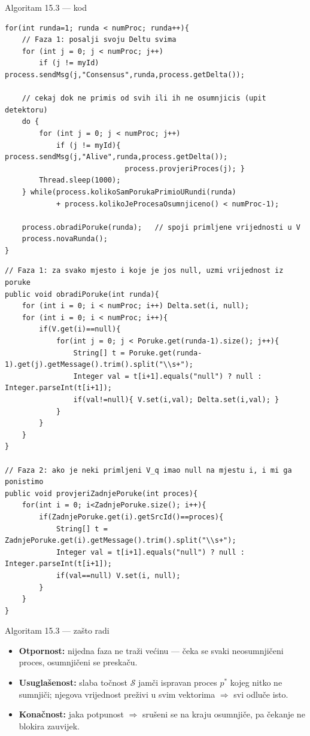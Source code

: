 \documentclass[aspectratio=169,11pt]{beamer}
\newcommand{\Ds}{\ensuremath{\mathcal{S}}}
\begin{document}
\begin{frame}{Algoritam 15.3 --- kod}
\begin{lstlisting}
for(int runda=1; runda < numProc; runda++){
    // Faza 1: posalji svoju Deltu svima
    for (int j = 0; j < numProc; j++)
        if (j != myId) process.sendMsg(j,"Consensus",runda,process.getDelta());

    // cekaj dok ne primis od svih ili ih ne osumnjicis (upit detektoru)
    do {
        for (int j = 0; j < numProc; j++)
            if (j != myId){ process.sendMsg(j,"Alive",runda,process.getDelta());
                            process.provjeriProces(j); }
        Thread.sleep(1000);
    } while(process.kolikoSamPorukaPrimioURundi(runda)
            + process.kolikoJeProcesaOsumnjiceno() < numProc-1);

    process.obradiPoruke(runda);   // spoji primljene vrijednosti u V
    process.novaRunda();
}
\end{lstlisting}

\begin{lstlisting}
// Faza 1: za svako mjesto i koje je jos null, uzmi vrijednost iz poruke
public void obradiPoruke(int runda){
    for (int i = 0; i < numProc; i++) Delta.set(i, null);
    for (int i = 0; i < numProc; i++){
        if(V.get(i)==null){
            for(int j = 0; j < Poruke.get(runda-1).size(); j++){
                String[] t = Poruke.get(runda-1).get(j).getMessage().trim().split("\\s+");
                Integer val = t[i+1].equals("null") ? null : Integer.parseInt(t[i+1]);
                if(val!=null){ V.set(i,val); Delta.set(i,val); }
            }
        }
    }
}

// Faza 2: ako je neki primljeni V_q imao null na mjestu i, i mi ga ponistimo
public void provjeriZadnjePoruke(int proces){
    for(int i = 0; i<ZadnjePoruke.size(); i++){
        if(ZadnjePoruke.get(i).getSrcId()==proces){
            String[] t = ZadnjePoruke.get(i).getMessage().trim().split("\\s+");
            Integer val = t[i+1].equals("null") ? null : Integer.parseInt(t[i+1]);
            if(val==null) V.set(i, null);
        }
    }
}
\end{lstlisting}
\end{frame}

\begin{frame}{Algoritam 15.3 --- zašto radi}
  \begin{itemize}
    \item \textbf{Otpornost:} nijedna faza ne traži većinu --- čeka se svaki
      neosumnjičeni proces, osumnjičeni se preskaču.
    \item \textbf{Usuglašenost:} slaba točnost \Ds{} jamči ispravan proces
      $p^\ast$ kojeg nitko ne sumnjiči; njegova vrijednost preživi u svim
      vektorima $\Rightarrow$ svi odluče isto.
    \item \textbf{Konačnost:} jaka potpunost $\Rightarrow$ srušeni se na kraju
      osumnjiče, pa čekanje ne blokira zauvijek.
  \end{itemize}
\end{frame}
\end{document}
